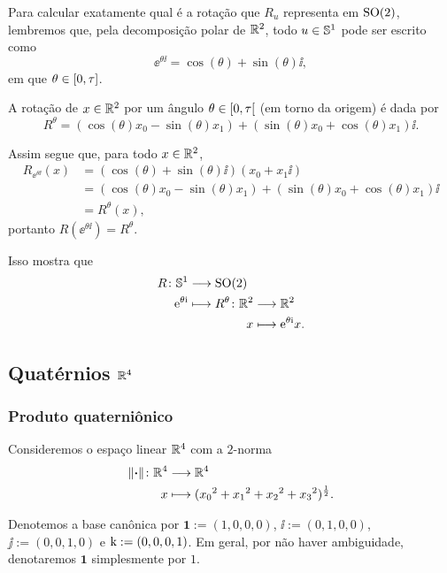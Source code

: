 Para calcular exatamente qual é a rotação que $R_u$ representa em $\SO(2)$, lembremos que, pela decomposição polar de $\R^2$, todo $u \in \S^1$ pode ser escrito como
	\begin{equation*}
	\ee^{\theta\ii} = \cos(\theta) + \sin(\theta)\ii,
	\end{equation*}
em que $\theta \in \intff{0}{\tau}$.

A rotação de $x \in \R^2$ por um ângulo $\theta \in \intfa{0}{\tau}$ (em torno da origem) é dada por
	\begin{equation*}
	R^\theta = (\cos(\theta)x_0 - \sin(\theta)x_1) + (\sin(\theta)x_0 + \cos(\theta)x_1) \ii.
	\end{equation*}

Assim segue que, para todo $x \in \R^2$,
	\begin{align*}
	R_{\ee^{\theta \ii}}(x) &= (\cos(\theta) + \sin(\theta)\ii)(x_0 + x_1 \ii) \\
		&= (\cos(\theta)x_0 - \sin(\theta)x_1) + (\sin(\theta)x_0 + \cos(\theta)x_1) \ii \\
		&= R^\theta(x),
	\end{align*}
portanto $R(\ee^{\theta \ii}) = R^{\theta}$.

Isso mostra que
	\begin{align*}
	\func{R}{\S^1}{\SO(2)}{\ee^{\theta \ii}}{
		\begin{aligned}[t]
			\func{R^{\theta}}{\R^2}{\R^2}{x}{\ee^{\theta \ii} x}.
		\end{aligned}
	}
	\end{align*}



\subsection{Quatérnios $\R^4$}

\subsubsection{Produto quaterniônico}

Consideremos o espaço linear $\R^4$ com a $2$-norma
	\begin{align*}
	\func{\nor{\var}}{\R^4}{\R^4}{x}{({x_0}^2+{x_1}^2+{x_2}^2+{x_3}^2)^{\frac{1}{2}}}.
	\end{align*}

Denotemos a base canônica por $\bm 1 := (1,0,0,0)$, $\ii := (0,1,0,0)$, $\jj := (0,0,1,0)$ e $\kk := (0,0,0,1)$. Em geral, por não haver ambiguidade, denotaremos $\bm 1$ simplesmente por $1$.


